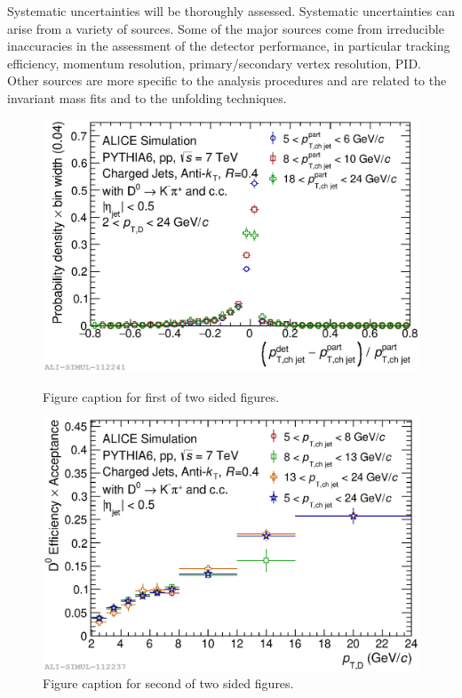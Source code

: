 \documentclass[a4paper]{jpconf}
\begin{document}
Systematic uncertainties will be thoroughly assessed. Systematic uncertainties can arise from a variety of sources.
Some of the major sources come from irreducible inaccuracies in the assessment of the detector performance, in particular tracking efficiency, 
momentum resolution, primary/secondary vertex resolution, PID.
Other sources are more specific to the analysis procedures and are related to the invariant mass fits and to the unfolding techniques.

\begin{figure}[h]
\centering
\begin{minipage}{.48\textwidth}
\includegraphics[width=\textwidth]{img/HQ16_Simulation_DetectorResponse}
\caption{\label{label}Figure caption for first of two sided figures.}
\end{minipage}\hspace{1pc}%
\begin{minipage}{.48\textwidth}
\includegraphics[width=\textwidth]{img/HQ16_Simulation_EfficiencyVsDPt}
\caption{\label{label}Figure caption for second of two sided figures.}
\end{minipage} 
\end{figure}
\end{document}

